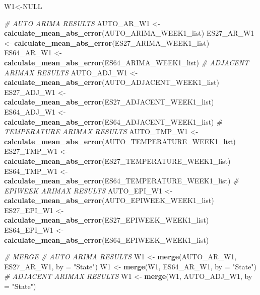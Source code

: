 \documentclass[
]{article}
\newenvironment{Shaded}{\begin{snugshade}}{\end{snugshade}}
\newcommand{\AttributeTok}[1]{\textcolor[rgb]{0.13,0.29,0.53}{#1}}
\newcommand{\CommentTok}[1]{\textcolor[rgb]{0.56,0.35,0.01}{\textit{#1}}}
\newcommand{\ConstantTok}[1]{\textcolor[rgb]{0.56,0.35,0.01}{#1}}
\newcommand{\FunctionTok}[1]{\textcolor[rgb]{0.13,0.29,0.53}{\textbf{#1}}}
\newcommand{\NormalTok}[1]{#1}
\newcommand{\OtherTok}[1]{\textcolor[rgb]{0.56,0.35,0.01}{#1}}
\newcommand{\StringTok}[1]{\textcolor[rgb]{0.31,0.60,0.02}{#1}}
\begin{document}
\begin{Shaded}
\begin{Highlighting}[]
\NormalTok{W1}\OtherTok{\textless{}{-}}\ConstantTok{NULL}

\CommentTok{\# AUTO ARIMA RESULTS}
\NormalTok{AUTO\_AR\_W1 }\OtherTok{\textless{}{-}} \FunctionTok{calculate\_mean\_abs\_error}\NormalTok{(AUTO\_ARIMA\_WEEK1\_list)}
\NormalTok{ES27\_AR\_W1 }\OtherTok{\textless{}{-}} \FunctionTok{calculate\_mean\_abs\_error}\NormalTok{(ES27\_ARIMA\_WEEK1\_list)}
\NormalTok{ES64\_AR\_W1 }\OtherTok{\textless{}{-}} \FunctionTok{calculate\_mean\_abs\_error}\NormalTok{(ES64\_ARIMA\_WEEK1\_list)}
\CommentTok{\# ADJACENT ARIMAX RESULTS}
\NormalTok{AUTO\_ADJ\_W1 }\OtherTok{\textless{}{-}} \FunctionTok{calculate\_mean\_abs\_error}\NormalTok{(AUTO\_ADJACENT\_WEEK1\_list)}
\NormalTok{ES27\_ADJ\_W1 }\OtherTok{\textless{}{-}} \FunctionTok{calculate\_mean\_abs\_error}\NormalTok{(ES27\_ADJACENT\_WEEK1\_list)}
\NormalTok{ES64\_ADJ\_W1 }\OtherTok{\textless{}{-}} \FunctionTok{calculate\_mean\_abs\_error}\NormalTok{(ES64\_ADJACENT\_WEEK1\_list)}
\CommentTok{\# TEMPERATURE ARIMAX RESULTS}
\NormalTok{AUTO\_TMP\_W1 }\OtherTok{\textless{}{-}} \FunctionTok{calculate\_mean\_abs\_error}\NormalTok{(AUTO\_TEMPERATURE\_WEEK1\_list)}
\NormalTok{ES27\_TMP\_W1 }\OtherTok{\textless{}{-}} \FunctionTok{calculate\_mean\_abs\_error}\NormalTok{(ES27\_TEMPERATURE\_WEEK1\_list)}
\NormalTok{ES64\_TMP\_W1 }\OtherTok{\textless{}{-}} \FunctionTok{calculate\_mean\_abs\_error}\NormalTok{(ES64\_TEMPERATURE\_WEEK1\_list)}
\CommentTok{\# EPIWEEK ARIMAX RESULTS}
\NormalTok{AUTO\_EPI\_W1 }\OtherTok{\textless{}{-}} \FunctionTok{calculate\_mean\_abs\_error}\NormalTok{(AUTO\_EPIWEEK\_WEEK1\_list)}
\NormalTok{ES27\_EPI\_W1 }\OtherTok{\textless{}{-}} \FunctionTok{calculate\_mean\_abs\_error}\NormalTok{(ES27\_EPIWEEK\_WEEK1\_list)}
\NormalTok{ES64\_EPI\_W1 }\OtherTok{\textless{}{-}} \FunctionTok{calculate\_mean\_abs\_error}\NormalTok{(ES64\_EPIWEEK\_WEEK1\_list)}

\CommentTok{\# MERGE}
\CommentTok{\# AUTO ARIMA RESULTS}
\NormalTok{W1 }\OtherTok{\textless{}{-}} \FunctionTok{merge}\NormalTok{(AUTO\_AR\_W1, ES27\_AR\_W1, }\AttributeTok{by =} \StringTok{"State"}\NormalTok{)}
\NormalTok{W1 }\OtherTok{\textless{}{-}} \FunctionTok{merge}\NormalTok{(W1, ES64\_AR\_W1, }\AttributeTok{by =} \StringTok{"State"}\NormalTok{)}
\CommentTok{\# ADJACENT ARIMAX RESULTS}
\NormalTok{W1 }\OtherTok{\textless{}{-}} \FunctionTok{merge}\NormalTok{(W1, AUTO\_ADJ\_W1, }\AttributeTok{by =} \StringTok{"State"}\NormalTok{)}
\end{Highlighting}
\end{Shaded}
\end{document}

